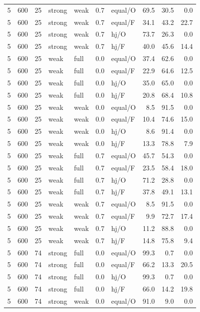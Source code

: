 {\begin{longtable}{@{}rrrllllrrr@{}}
5 & 600 & 25 & strong & weak & 0.7 & equal/O & 69.5 & 30.5 & 0.0\\
5 & 600 & 25 & strong & weak & 0.7 & equal/F & 34.1 & 43.2 & 22.7\\
5 & 600 & 25 & strong & weak & 0.7 & hj/O & 73.7 & 26.3 & 0.0\\
5 & 600 & 25 & strong & weak & 0.7 & hj/F & 40.0 & 45.6 & 14.4\\
5 & 600 & 25 & weak & full & 0.0 & equal/O & 37.4 & 62.6 & 0.0\\
5 & 600 & 25 & weak & full & 0.0 & equal/F & 22.9 & 64.6 & 12.5\\
5 & 600 & 25 & weak & full & 0.0 & hj/O & 35.0 & 65.0 & 0.0\\
5 & 600 & 25 & weak & full & 0.0 & hj/F & 20.8 & 68.4 & 10.8\\
5 & 600 & 25 & weak & weak & 0.0 & equal/O & 8.5 & 91.5 & 0.0\\
5 & 600 & 25 & weak & weak & 0.0 & equal/F & 10.4 & 74.6 & 15.0\\
5 & 600 & 25 & weak & weak & 0.0 & hj/O & 8.6 & 91.4 & 0.0\\
5 & 600 & 25 & weak & weak & 0.0 & hj/F & 13.3 & 78.8 & 7.9\\
5 & 600 & 25 & weak & full & 0.7 & equal/O & 45.7 & 54.3 & 0.0\\
5 & 600 & 25 & weak & full & 0.7 & equal/F & 23.5 & 58.4 & 18.0\\
5 & 600 & 25 & weak & full & 0.7 & hj/O & 71.2 & 28.8 & 0.0\\
5 & 600 & 25 & weak & full & 0.7 & hj/F & 37.8 & 49.1 & 13.1\\
5 & 600 & 25 & weak & weak & 0.7 & equal/O & 8.5 & 91.5 & 0.0\\
5 & 600 & 25 & weak & weak & 0.7 & equal/F & 9.9 & 72.7 & 17.4\\
5 & 600 & 25 & weak & weak & 0.7 & hj/O & 11.2 & 88.8 & 0.0\\
5 & 600 & 25 & weak & weak & 0.7 & hj/F & 14.8 & 75.8 & 9.4\\
5 & 600 & 74 & strong & full & 0.0 & equal/O & 99.3 & 0.7 & 0.0\\
5 & 600 & 74 & strong & full & 0.0 & equal/F & 66.2 & 13.3 & 20.5\\
5 & 600 & 74 & strong & full & 0.0 & hj/O & 99.3 & 0.7 & 0.0\\
5 & 600 & 74 & strong & full & 0.0 & hj/F & 66.0 & 14.2 & 19.8\\
5 & 600 & 74 & strong & weak & 0.0 & equal/O & 91.0 & 9.0 & 0.0\\

\end{longtable}}

